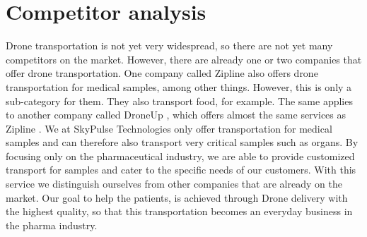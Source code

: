 \chapter{Competitor analysis}
Drone transportation is not yet very widespread, so there are not yet many competitors on the market. However, there are already one or two companies that offer drone transportation. One company called Zipline \cite{zipline_24} also offers drone transportation for medical samples, among other things. However, this is only a sub-category for them. They also transport food, for example. The same applies to another company called DroneUp \cite{droneup}, which offers almost the same services as Zipline \cite{zipline_24}. We at SkyPulse Technologies only offer transportation for medical samples and can therefore also transport very critical samples such as organs. By focusing only on the pharmaceutical industry, we are able to provide customized transport for samples and cater to the specific needs of our customers. With this service we distinguish ourselves from other companies that are already on the market. Our goal to help the patients, is achieved through Drone delivery with the highest quality, so that this transportation becomes an everyday business in the pharma industry.